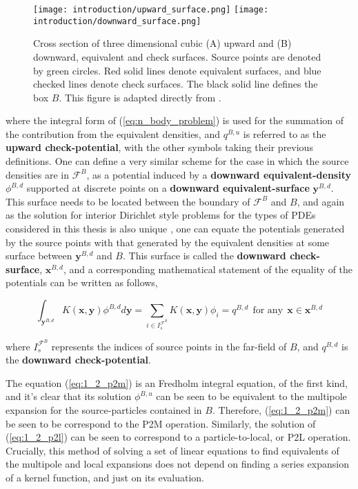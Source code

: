 \begin{figure}[!h]
    \centering
    {\texttt{[image: introduction/upward\_surface.png]}}
    \hfill
  {\texttt{[image: introduction/downward\_surface.png]}}
  \vspace{0pt}
  \caption{Cross section of three dimensional cubic (A) upward and (B) downward,
    equivalent and check surfaces. Source points are denoted by green circles. Red solid lines
    denote equivalent surfaces, and blue checked lines denote check surfaces.
    The black solid line defines the box $B$. This figure is adapted directly from \cite{Ying:2004:JCP}.}
  \label{fig:1_2_upward_downward_surfaces}
\end{figure}

where the integral form of (\ref{eq:n_body_problem}) is used for the summation of
the contribution from the equivalent densities, and $q^{B, u}$ is referred to as
the \textbf{upward \gls{check-potential}}, with the other symbols taking their previous
definitions. One can define a very similar scheme for the case in which the source
densities are in $\mathcal{F}^B$, as a potential induced by a
\textbf{downward \gls{equivalent-density}} $\phi^{B,d}$ supported at discrete points
on a \textbf{downward \gls{equivalent-surface}} $\mathbf{y}^{B,d}$. This surface
needs to be located between the boundary of $\mathcal{F}^B$ and $B$, and again
as the solution for interior Dirichlet style problems for the types of PDEs
considered in this thesis is also unique \cite{Ying:2004:JCP}, one can equate the potentials generated
by the source points with that generated by the equivalent densities at some surface
between $\mathbf{y}^{B,d}$ and $B$. This surface is called the \textbf{downward \gls{check-surface}},
$\mathbf{x}^{B,d}$, and a corresponding mathematical statement of the equality of
the potentials can be written as follows,

\begin{equation}
    \int_{\mathbf{y}^{B,d}} K(\mathbf{x}, \mathbf{y})\phi^{B, d} d\mathbf{y} = \sum_{i \in I_s^{\mathcal{F}^B}} K(\mathbf{x}, \mathbf{y})\phi_i = q^{B, d} \> \> \text{for any} \> \> \mathbf{x} \in \mathbf{x}^{B, d}
    \label{eq:1_2_p2l}
\end{equation}

where $I_s^{\mathcal{F}^B}$ represents the indices of source points in the \gls{far-field}
of $B$, and $q^{B, d}$ is the \textbf{downward \gls{check-potential}}.

The equation (\ref{eq:1_2_p2m}) is an Fredholm integral
equation, of the first kind, and it's clear that its solution $\phi^{B, u}$
can be seen to be equivalent to the multipole expansion for the \gls{source-particles} contained in $B$. Therefore,
(\ref{eq:1_2_p2m}) can be seen to be correspond to the \gls{P2M}
operation. Similarly, the solution of (\ref{eq:1_2_p2l}) can be seen
to correspond to a particle-to-local, or P2L operation. Crucially, this method of solving
a set of linear equations to find equivalents of the multipole and local expansions
does not depend on finding a series expansion of a kernel function, and just on its evaluation.

